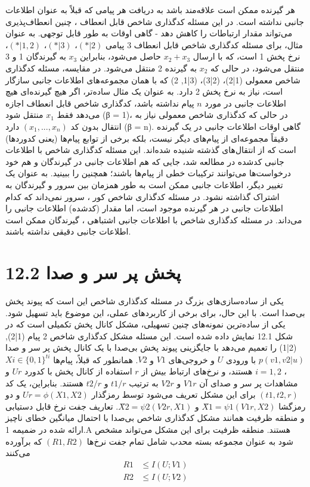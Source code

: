 هر گیرنده ممکن است علاقه‌مند باشد به دریافت هر پیامی که قبلاً به عنوان اطلاعات جانبی نداشته است. در این مسئله کدگذاری شاخص قابل انعطاف \lr{[31, 138]}، چنین انعطاف‌پذیری می‌تواند مقدار ارتباطات را کاهش دهد - گاهی اوقات به طور قابل توجهی. به عنوان مثال، برای مسئله کدگذاری شاخص قابل انعطاف 3 پیامی \((\ast|2)\)، \((\ast|3)\)، \((\ast|1, 2)\)، نرخ پخش 1 است، که با ارسال \(x_2 + x_3\) حاصل می‌شود، بنابراین \(x_3\) به گیرندگان 1 و 3 منتقل می‌شود، در حالی که \(x_2\) به گیرنده 2 منتقل می‌شود. در مقایسه، مسئله کدگذاری شاخص معمولی (1|2)، (2|3)، (3|1, 2) که با همان مجموعه‌های اطلاعات جانبی سازگار است، نیاز به نرخ پخش 2 دارد. به عنوان یک مثال ساده‌تر، اگر هیچ گیرنده‌ای هیچ اطلاعات جانبی در مورد \(n\) پیام نداشته باشد، کدگذاری شاخص قابل انعطاف اجازه می‌دهد فقط \(x_1\) منتقل شود (β = 1)، در حالی که کدگذاری شاخص معمولی نیاز به انتقال بدون کد \((x_1, . . . , x_n)\) دارد (β = n).
گاهی اوقات اطلاعات جانبی در یک گیرنده دقیقاً مجموعه‌ای از پیام‌های دیگر نیست، بلکه برخی از توابع پیام‌ها (یعنی کدوردها) است که از انتقال‌های گذشته شنیده شده‌اند. این مسئله کدگذاری شاخص با اطلاعات جانبی کدشده در \lr{[50]} مطالعه شد، جایی که هم اطلاعات جانبی در گیرندگان و هم خود درخواست‌ها می‌توانند ترکیبات خطی از پیام‌ها باشند؛ همچنین \lr{[92, 32]} را ببینید.
به عنوان یک تغییر دیگر، اطلاعات جانبی ممکن است به طور همزمان بین سرور و گیرندگان به اشتراک گذاشته نشود. در مسئله کدگذاری شاخص کور \lr{[83]}، سرور نمی‌داند که کدام اطلاعات جانبی در هر گیرنده موجود است، اما مقدار (کدشده) اطلاعات جانبی را می‌داند. در مسئله کدگذاری شاخص با اطلاعات جانبی اشتباهی \lr{[85]}، گیرندگان ممکن است اطلاعات جانبی دقیقی نداشته باشند.


\section{12.2 پخش پر سر و صدا}

یکی از ساده‌سازی‌های بزرگ در مسئله کدگذاری شاخص این است که پیوند پخش بی‌صدا است. با این حال، برای برخی از کاربردهای عملی، این موضوع باید تسهیل شود. یکی از ساده‌ترین نمونه‌های چنین تسهیلی، مشکل کانال پخش تکمیلی \lr{[155, 157, 89]} است که در شکل 12.1 نمایش داده شده است. این مسئله مشکل کدگذاری شاخص 2 پیام (1|2),(2|1) را تعمیم می‌دهد با جایگزینی پیوند پخش بی‌صدا با یک کانال پخش پر سر و صدا \(p(v1, v2|u)\) با ورودی \(U\) و خروجی‌های \(V1\) و \(V2\). همانطور که قبلاً، پیام‌ها \(Xi \in \{0, 1\}^{ti}\)، \(i = 1, 2\) هستند، و نرخ‌های ارتباط بیش از \(r\) استفاده از کانال پخش با کدورد \(Ur\) و مشاهدات پر سر و صدای آن \(V1r\) و \(V2r\) به ترتیب \(t1/r\) و \(t2/r\) هستند. بنابراین، یک کد \((t1,t2,r)\) برای این مشکل تعریف می‌شود توسط رمزگذار \(Ur = \phi(X1,X2)\) و دو رمزگشا \(X̂1 = \psi1(V1r, X2)\) و \(X̂2 = \psi2(V2r, X1)\). تعاریف جفت نرخ قابل دستیابی و منطقه ظرفیت همانند مشکل کدگذاری شاخص بی‌صدا با احتمال میانگین خطای ناچیز ارائه شده در ضمیمه 1.A هستند. منطقه ظرفیت برای این مشکل می‌تواند مشخص شود به عنوان مجموعه بسته محدب شامل تمام جفت نرخ‌ها \((R1, R2)\) که برآورده می‌کنند
\begin{align*}
    R1 &\leq I(U;V1) \\
    R2 &\leq I(U;V2)
\end{align*}

